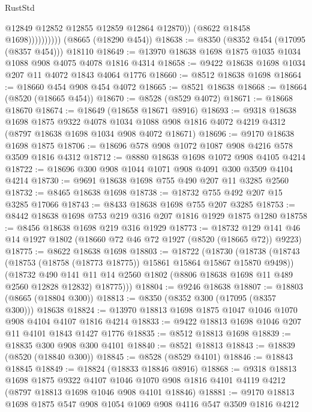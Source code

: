 \begin{lexlean}{RustStd}
\begin{coremodule}
                          @12849
                          @12852
                          @12855
                          @12859
                          @12864
                          @12870))
                      (@8622 @18458 @1698))))))))))
    (@8665 (@18290 @454))
@18638 := @8350 (@8352 @454 (@17095 (@8357 @454))) @18110
@18649 := @13970 @18638 @1698 @1875 @1035 @1034 @1088 @908 @4075 @4078 @1816 @4314
@18658 := @9422 @18638 @1698 @1034 @207 @11 @4072 @1843 @4064 @1776
@18660 := @8512 @18638 @1698
@18664 := @18660 @454 @908 @454 @4072
@18665 := @8521 @18638
@18668 := @18664 (@8520 (@18665 @454))
@18670 := @8528 (@8529 @4072)
@18671 := @18668 @18670
@18674 := @18649 (@18658 @18671 @8916)
@18693 := @9318
    @18638
    @1698
    @1875
    @9322
    @4078
    @1034
    @1088
    @908
    @1816
    @4072
    @4219
    @4312
    (@8797 @18638 @1698 @1034 @908 @4072 @18671)
@18696 := @9170 @18638 @1698 @1875
@18706 := @18696 @578 @908 @1072 @1087 @908 @4216 @578 @3509 @1816 @4312
@18712 := @8880 @18638 @1698 @1072 @908 @4105 @4214
@18722 := @18696 @300 @908 @1044 @1071 @908 @4091 @300 @3509 @4104 @4214
@18730 := @9691 @18638 @1698 @755 @490 @207 @11 @3285 @2560
@18732 := @8465 @18638 @1698
@18738 := @18732 @755 @492 @207 @15 @3285 @17066
@18743 := @8433 @18638 @1698 @755 @207 @3285
@18753 := @8442 @18638 @1698 @753 @219 @316 @207 @1816 @1929 @1875 @1280
@18758 := @8456 @18638 @1698 @219 @316 @1929
@18773 := @18732 @129 @141 @46 @14 @1927 @1802 (@18660 @72 @46 @72 @1927 (@8520 (@18665 @72)) @9223)
@18775 := @8622 @18638 @1698
@18803 := @18722
    (@18730
      (@18738
        (@18743 (@18753 (@18758 (@18773 @18775)) @15861 @15864 @15867 @15870 @9498))
        (@18732
          @490
          @141
          @11
          @14
          @2560
          @1802
          (@8806 @18638 @1698 @11 @489 @2560 @12828 @12832)
          @18775)))
@18804 := @9246 @18638
@18807 := @18803 (@8665 (@18804 @300))
@18813 := @8350 (@8352 @300 (@17095 (@8357 @300))) @18638
@18824 := @13970 @18813 @1698 @1875 @1047 @1046 @1070 @908 @4104 @4107 @1816 @4214
@18833 := @9422 @18813 @1698 @1046 @207 @11 @4101 @1843 @1427 @1776
@18835 := @8512 @18813 @1698
@18839 := @18835 @300 @908 @300 @4101
@18840 := @8521 @18813
@18843 := @18839 (@8520 (@18840 @300))
@18845 := @8528 (@8529 @4101)
@18846 := @18843 @18845
@18849 := @18824 (@18833 @18846 @8916)
@18868 := @9318
    @18813
    @1698
    @1875
    @9322
    @4107
    @1046
    @1070
    @908
    @1816
    @4101
    @4119
    @4212
    (@8797 @18813 @1698 @1046 @908 @4101 @18846)
@18881 := @9170 @18813 @1698 @1875 @547 @908 @1054 @1069 @908 @4116 @547 @3509 @1816 @4212

\end{coremodule}
\end{lexlean}
